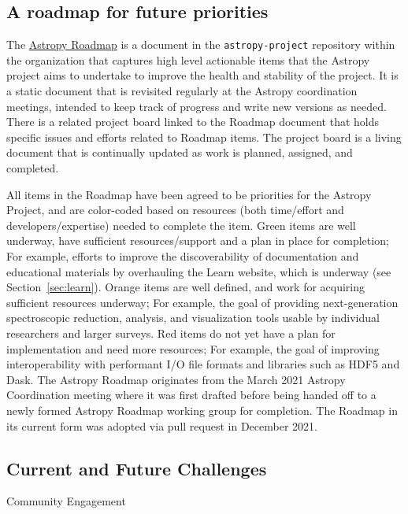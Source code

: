 \documentclass[modern]{aastex631}
\newcommand{\secauthor}[1]{{\color{blue}Author:~\textit{#1}}}
\begin{document}
\subsection{A roadmap for future priorities}

The
\href{https://github.com/astropy/astropy-project/blob/main/roadmap/roadmap.md}{Astropy Roadmap} is a document in the \texttt{astropy-project} \github
repository within the \astropy organization that captures high level actionable
items that the Astropy project aims to undertake to improve the health and
stability of the project. It is a static document that is revisited regularly at
the Astropy coordination meetings, intended to keep track of progress and write
new versions as needed. There is a related project board linked to the Roadmap
document that holds specific issues and efforts related to Roadmap items. The
project board is a living document that is continually updated as work is
planned, assigned, and completed.

All items in the Roadmap have been agreed to be priorities for the Astropy
Project, and are color-coded based on resources (both time/effort and
developers/expertise) needed to complete the item. Green items are well
underway, have sufficient resources/support and a plan in place for completion;
For example, efforts to improve the discoverability of documentation and
educational materials by overhauling the Learn website, which is underway (see
Section~\ref{sec:learn}).
Orange items are well defined, and work for acquiring sufficient resources
underway; For example, the goal of providing next-generation spectroscopic
reduction, analysis, and visualization tools usable by individual researchers
and larger surveys.
Red items do not yet have a plan for implementation and need more resources; For
example, the goal of improving interoperability with performant I/O file formats
and libraries such as HDF5 and Dask.
The Astropy Roadmap originates from the March 2021 Astropy Coordination meeting
where it was first drafted before being handed off to a newly formed Astropy
Roadmap working group for completion. The Roadmap in its current form was
adopted via pull request in December 2021.


\subsection{Current and Future Challenges}

Community Engagement
\end{document}
